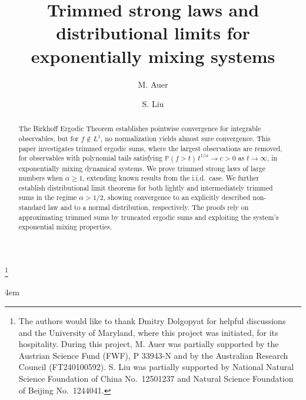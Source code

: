\documentclass[11pt,twoside,a4paper,reqno]{amsart}
\renewcommand{\P}{\mathbb{P}}
\begin{document}
\title[Trimmed strong laws and distributional limits]
{Trimmed strong laws and distributional limits for exponentially mixing systems}

\author{M. Auer}
\address[M.~Auer]{School of Mathematics and Physics \\ University of Queensland, Australia.}
\author{S. Liu}
\address[S.~Liu]{Beijing Institute of Mathematical Sciences and Applications\\ Beijing 101408, China.}


\thanks{The authors would like to thank Dmitry Dolgopyat for helpful discussions and the University of Maryland, where this project was initiated, for its hospitality. During this project, M. Auer was partially supported by the Austrian Science Fund (FWF), P 33943-N and by the Australian Research Council (FT240100592). S. Liu was partially supported by National Natural
Science Foundation of China No.~12501237 and Natural Science Foundation of Beijing No.~1244041.}


\date{}


\begingroup
\leftskip4em
\rightskip\leftskip
\begin{small}


\begin{abstract}
The Birkhoff Ergodic Theorem establishes pointwise convergence for integrable observables, but for $f\notin L^1$, no normalization yields almost sure convergence. This paper investigates trimmed ergodic sums, where the largest observations are removed, for observables with polynomial tails satisfying $\P(f>t)\,t^{1/\alpha}\to c>0$ as $t\to\infty$, in exponentially mixing dynamical systems. We prove trimmed strong laws of large numbers when $\alpha\geq 1$, extending known results from the i.i.d.\ case. We further establish distributional limit theorems for both lightly and intermediately trimmed sums in the regime $\alpha>1/2$, showing convergence to an explicitly described non-standard law and to a normal distribution, respectively. The proofs rely on approximating trimmed sums by truncated ergodic sums and exploiting the system's exponential mixing properties.
\end{abstract}







\end{small}
\maketitle
\par
\endgroup
\end{document}
